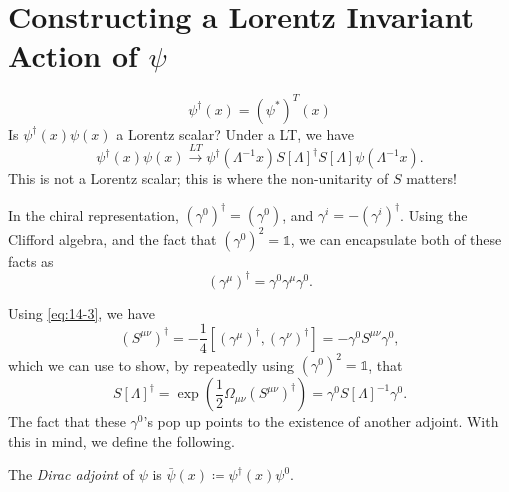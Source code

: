 \section{Constructing a Lorentz Invariant Action of \texorpdfstring{$\psi$}{psi}}%
\label{sec:constructing_a_lorentz_invariant_action_of_psi_}

\begin{equation}
  \psi^{\dagger}(x) = (\psi^*)^T(x)
\end{equation}
Is $\psi^{\dagger}(x) \psi(x)$ a Lorentz scalar?
Under a LT, we have
\begin{equation}
  \psi^{\dagger}(x) \psi(x) \xrightarrow{LT} \psi^{\dagger}(\Lambda^{-1}x) S[\Lambda]^{\dagger} S[\Lambda] \psi(\Lambda^{-1} x).
\end{equation}
This is not a Lorentz scalar; this is where the non-unitarity of $S$ matters! 
\begin{leftbar}
  \begin{remark}
    In the chiral representation, $(\gamma^0)^{\dagger} = (\gamma^0)$, and $\gamma^i = -(\gamma^i)^{\dagger}$. Using the Clifford algebra, and the fact that $(\gamma^0)^2 = \mathbb{1}$, we can encapsulate both of these facts as
    \begin{equation}
      \label{eq:14-3}
      (\gamma^{\mu})^{\dagger} = \gamma^0 \gamma^{\mu} \gamma^0.
    \end{equation}
  \end{remark}
\end{leftbar}
Using \eqref{eq:14-3}, we have
\begin{equation}
  (S^{\mu\nu})^{\dagger} = - \frac{1}{4} [(\gamma^{\mu})^{\dagger}, (\gamma^{\nu})^{\dagger}] = -\gamma^0 S^{\mu\nu} \gamma^0,
\end{equation}
which we can use to show, by repeatedly using $(\gamma^0)^2 = \mathbb{1}$, that
\begin{equation}
  S[\Lambda]^{\dagger} = \exp(\frac{1}{2} \Omega_{\mu\nu} (S^{\mu\nu})^{\dagger}) = \gamma^0 S[\Lambda]^{-1} \gamma^0.
\end{equation}
The fact that these $\gamma^0$'s pop up points to the existence of another adjoint. With this in mind, we define the following.
\begin{definition}[]
  The \emph{Dirac adjoint} of $\psi$ is $\bar \psi(x) \coloneqq \psi^{\dagger}(x) \psi^0$.
\end{definition}

